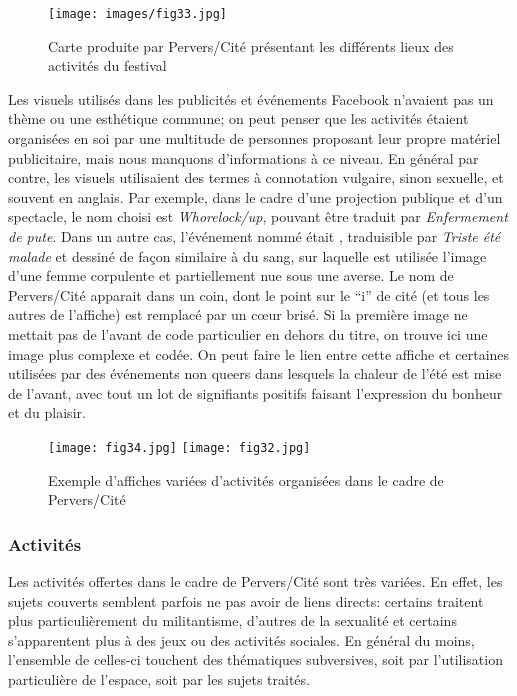 \begin{figure}[ht]
	\centering
	\texttt{[image: images/fig33.jpg]}
	\caption{Carte produite par Pervers/Cité présentant les différents lieux des activités du festival}\label{fig:carte_perverscite}
\end{figure}

Les visuels utilisés dans les publicités et événements Facebook n'avaient pas un thème ou une esthétique commune; on peut penser que les activités étaient organisées en soi par une multitude de personnes proposant leur propre matériel publicitaire, mais nous manquons d'informations à ce niveau.
En général par contre, les visuels utilisaient des termes à connotation vulgaire, sinon sexuelle, et souvent en anglais.
Par exemple, dans le cadre d'une projection publique et d'un spectacle, le nom choisi est \emph{Whorelock/up}, pouvant être traduit par \emph{Enfermement de pute}.
Dans un autre cas, l'événement nommé était , traduisible par \emph{Triste été malade} et dessiné de façon similaire à du sang, sur laquelle est utilisée l'image d'une femme corpulente et partiellement nue sous une averse.
Le nom de Pervers/Cité apparait dans un coin, dont le point sur le \enquote{i} de cité (et tous les autres de l'affiche) est remplacé par un cœur brisé.
Si la première image ne mettait pas de l'avant de code particulier en dehors du titre, on trouve ici une image plus complexe et codée.
On peut faire le lien entre cette affiche et certaines utilisées par des événements non queers dans lesquels la chaleur de l'été est mise de l'avant, avec tout un lot de signifiants positifs faisant l'expression du bonheur et du plaisir.

\begin{figure}
\centering
{}
{\texttt{[image: fig34.jpg]}}
{\texttt{[image: fig32.jpg]}}
\caption{Exemple d'affiches variées d'activités organisées dans le cadre de Pervers/Cité}\label{figs3132}
\end{figure}

\subsubsection{Activités}
\label{subsec:activitesperverscite}
Les activités offertes dans le cadre de Pervers/Cité sont très variées.
En effet, les sujets couverts semblent parfois ne pas avoir de liens directs: certains traitent plus particulièrement du militantisme, d'autres de la sexualité et certains s'apparentent plus à des jeux ou des activités sociales.
En général du moins, l'ensemble de celles-ci touchent des thématiques subversives, soit par l'utilisation particulière de l'espace, soit par les sujets traités.

